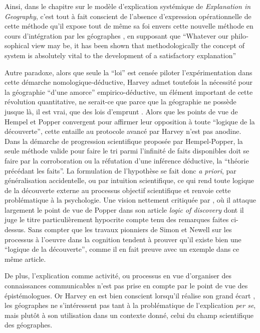 Ainsi, dans le chapitre sur le modèle d'explication systémique de \textit{Explanation in Geography}, c'est tout à fait conscient de l'absence d'expression opérationnelle de cette méthode qu'il expose tout de même sa foi envers cette nouvelle méthode en cours d'intégration par les géographes \autocite[449,469]{Harvey1969}, en supposant que \foreignquote{english}{Whatever our philosophical view may be, it has been shown that methodologically the concept of system is absolutely vital to the development of a satisfactory explanation} \autocite[479]{Harvey1969}

Autre paradoxe, alors que seule la \enquote{loi} est censée piloter l’expérimentation dans cette démarche nomologique-déductive, Harvey admet toutefois la nécessité pour la géographie \enquote{d'une amorce} empirico-déductive, un élément important de cette révolution quantitative, ne serait-ce que parce que la géographie ne possède jusque là, il est vrai, que des lois d'emprunt \autocite[41-42]{Harvey1969}. Alors que les points de vue de Hempel et Popper convergent pour affirmer leur opposition à toute \enquote{logique de la découverte}, cette entaille au protocole avancé par Harvey n'est pas anodine. Dans la démarche de progression scientifique proposée par Hempel-Popper, la seule méthode valide pour faire le tri parmi l'infinité de faits disponibles doit se faire par la corroboration ou la réfutation d'une inférence déductive, la \enquote{théorie précédant les faits}. La formulation de l'hypothèse se fait donc \textit{a priori}, par généralisation accidentelle, ou par intuition scientifique, ce qui rend toute logique de la découverte externe au processus objectif scientifique et renvoie cette problématique à la psychologie. Une vision nettement critiquée par \textcite{Simon1973}, où il attaque largement le point de vue de Popper dans son article \textit{logic of discovery} dont il juge le titre particulièrement hypocrite compte tenu des remarques faites ci-dessus. Sans compter que les travaux pionniers \autocite{Langley2004} de Simon et Newell \autocite{Newell1961} sur les processus à l'oeuvre dans la cognition tendent à prouver qu'il existe bien une \enquote{logique de la découverte}, comme il en fait preuve avec un exemple dans ce même article.


De plus, l'explication comme activité, ou processus en vue d'organiser des connaissances communicables n'est pas prise en compte par le point de vue des épistémologues. Or Harvey en est bien conscient lorsqu'il réalise son grand écart \autocite[10]{Harvey1969}, les géographes ne s’intéressent pas tant à la problématique de l'explication \textit{per se}, mais plutôt à son utilisation dans un contexte donné, celui du champ scientifique des géographes.

